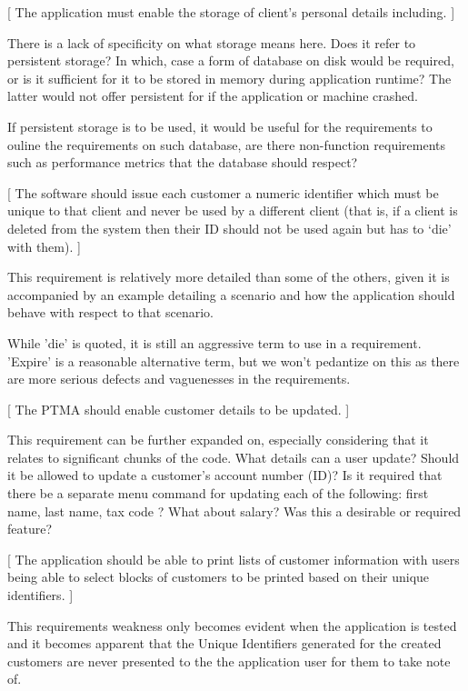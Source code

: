 
[ The application must enable the storage of client’s personal details including.  ] 

There is a lack of specificity on what storage means here. Does it refer to persistent storage? In which, case a form of database on disk would be required, or is it sufficient for it to be stored in memory during application runtime? The latter would not offer persistent for if the application or machine crashed.  

If persistent storage is to be used, it would be useful for the requirements to ouline the requirements on such database, are there non-function requirements such as performance metrics that the database should respect? 

[ The software should issue each customer a numeric identifier which must be unique to that client and never be used by a different client (that is, if a client is deleted from the system then their ID should not be used again but has to ‘die’ with them). ] 

This requirement is relatively more detailed than some of the others, given it is accompanied by an example detailing a scenario and how the application should behave with respect to that scenario. 

While 'die' is quoted, it is still an aggressive term to use in a requirement. 'Expire' is a reasonable alternative term, but we won't pedantize on this as there are more serious defects and vaguenesses in the requirements.

[ The PTMA should enable customer details to be updated. ]

This requirement can be further expanded on, especially considering that it relates to significant chunks of the code. 
What details can a user update? Should it be allowed to update a customer's account number (ID)?
Is it required that there be a separate menu command for updating each of the following: first name, last name, tax code ? What about salary? Was this a desirable or required feature?    

[ The application should be able to print lists of customer information with users being able to select blocks of customers to be printed based on their unique identifiers. ]

This requirements weakness only becomes evident when the application is tested and it becomes apparent that the Unique Identifiers generated for the created customers are never presented to the the application user for them to take note of. 

